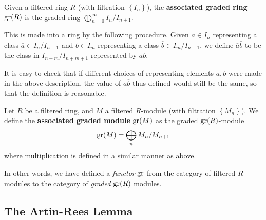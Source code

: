 \begin{definition} Given a filtered ring $R$ (with filtration
$\left\{I_n\right\}$), the
\textbf{associated graded ring} $\operatorname{gr}(R)$ is the graded ring $\bigoplus_{n=0}^\infty I_n /I_{n+1}$.

This is made into a ring by the following procedure. Given $a \in I_n$
representing a class $\overline{a} \in I_n/I_{n+1}$ and $b \in I_m$
representing a class $\overline{b} \in I_m/I_{n+1}$, we define
$\overline{a}\overline{b} $ to be the class in $I_{n+m}/I_{n+m+1}$ represented
by $ab$. 
\end{definition}

It is easy to check that if different choices of representing elements $a,b$ were made in the above
description, the value of $\overline{a}\overline{b}$ thus defined would still
be the same, so that the definition is reasonable.


\begin{definition} 
Let $R$ be a filtered ring, and $M$ a filtered $R$-module (with filtration
$\left\{M_n\right\}$). We define the \textbf{associated graded module}
$\operatorname{gr}(M)$ as the graded $\operatorname{gr}(R)$-module
\[ \operatorname{gr}(M) = \bigoplus_{n} M_n/M_{n+1}  \]
where multiplication is defined in a similar manner as above.
\end{definition} 

In other words, we have defined a \emph{functor} $\operatorname{gr}$ from the category of filtered
$R$-modules to the category of \emph{graded} $\operatorname{gr}(R)$ modules.
\subsection{The Artin-Rees Lemma}

